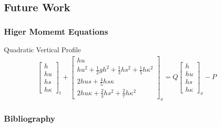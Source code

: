 \documentclass[10pt]{beamer}
\begin{document}
    \subsection{Future Work}
      \begin{frame}
        \frametitle{Higer Momemt Equations}
        Quadratic Vertical Profile
        \begin{align*}
          \begin{bmatrix}
            h \\
            hu \\
            hs \\
            h\kappa
          \end{bmatrix}_t +
          \begin{bmatrix}
            hu \\
            hu^2 + \frac{1}{2} gh^2 + \frac{1}{3}hs^2 + \frac{1}{5} h \kappa^2 \\
            2hus + \frac{4}{5}hs\kappa \\
            2hu\kappa + \frac{2}{3}hs^2 + \frac{2}{7}h \kappa^2
          \end{bmatrix}_x =
          Q
          \begin{bmatrix}
            h \\
            hu \\
            hs \\
            h\kappa
          \end{bmatrix}_x - P
        \end{align*}
        

      \end{frame}


    \begin{frame}[allowframebreaks]
      \frametitle{Bibliography}
      \nocite{*}
      \printbibliography{}
    \end{frame}
\end{document}
